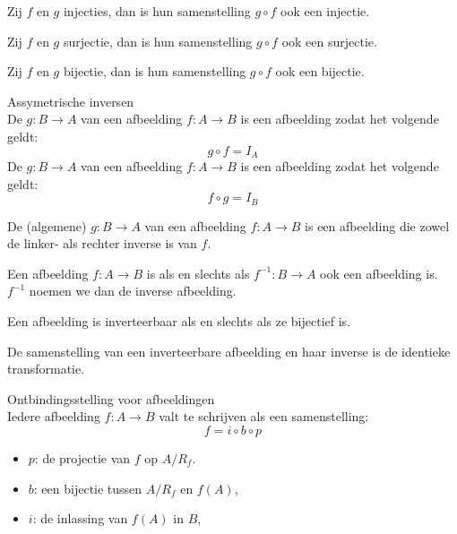 \documentclass[main.tex]{subfiles}
\begin{document}
\begin{st}
  Zij $f$ en $g$ injecties, dan is hun samenstelling $g \circ f$ ook een injectie.
\end{st}

\begin{st}
  Zij $f$ en $g$ surjectie, dan is hun samenstelling $g \circ f$ ook een surjectie.
\end{st}

\begin{st}
  Zij $f$ en $g$ bijectie, dan is hun samenstelling $g \circ f$ ook een bijectie.
\end{st}

\begin{de}
  Assymetrische inversen\\
  De  $g:B \rightarrow A$ van een afbeelding $f:A \rightarrow B$ is een afbeelding zodat het volgende geldt:
  \[ g \circ f = I_{A} \]
  De  $g:B \rightarrow A$ van een afbeelding $f:A \rightarrow B$ is een afbeelding zodat het volgende geldt:
  \[ f \circ g = I_{B}\]
\end{de}

\begin{de}
  De (algemene)  $g:B \rightarrow A$ van een afbeelding $f:A \rightarrow B$ is een afbeelding die zowel de linker- als rechter inverse is van $f$.
\end{de}

\begin{de}
  Een afbeelding $f: A \rightarrow B$ is  als en slechts als $f^{-1}: B \rightarrow A$ ook een afbeelding is. $f^{-1}$ noemen we dan de inverse afbeelding.
\end{de}

\begin{st}
  \label{st:afb-inverse-asa-bijectief}
  Een afbeelding is inverteerbaar als en slechts als ze bijectief is.
\end{st}

\begin{st}
  \label{st:afb+inverse=identieke}
  De samenstelling van een inverteerbare afbeelding en haar inverse is de identieke transformatie.
\end{st}

\begin{st}
  Ontbindingsstelling voor afbeeldingen\\
  Iedere afbeelding $f:A\rightarrow B$ valt te schrijven als een samenstelling:
  \[ f = i \circ b \circ p \]
  \begin{itemize}
  \item $p$: de projectie van $f$ op $A/R_{f}$.
  \item $b$: een bijectie tussen $A/R_{f}$ en $f(A)$,
  \item $i$: de inlassing van $f(A)$ in $B$,
  \end{itemize}

\end{st}
\end{document}
